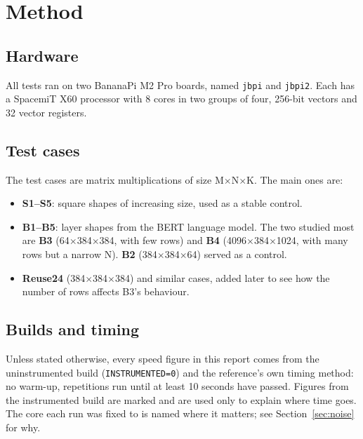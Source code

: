 \documentclass[11pt,a4paper]{article}
\begin{document}
\section{Method}

\subsection{Hardware}
All tests ran on two BananaPi M2 Pro boards, named \texttt{jbpi} and \texttt{jbpi2}. Each has a SpacemiT X60
processor with 8 cores in two groups of four, 256-bit vectors and 32 vector registers.

\subsection{Test cases}
The test cases are matrix multiplications of size M$\times$N$\times$K. The main ones are:
\begin{itemize}
  \item \textbf{S1--S5}: square shapes of increasing size, used as a stable control.
  \item \textbf{B1--B5}: layer shapes from the BERT language model. The two studied most are
  \textbf{B3} (64$\times$384$\times$384, with few rows) and \textbf{B4} (4096$\times$384$\times$1024, with many
  rows but a narrow N). \textbf{B2} (384$\times$384$\times$64) served as a control.
  \item \textbf{Reuse24} (384$\times$384$\times$384) and similar cases, added later to see how the number of rows
  affects B3's behaviour.
\end{itemize}

\subsection{Builds and timing}
Unless stated otherwise, every speed figure in this report comes from the uninstrumented build
(\texttt{INSTRUMENTED=0}) and the reference's own timing method: no warm-up, repetitions run until at least
10 seconds have passed. Figures from the instrumented build are marked and are used only to explain where time
goes. The core each run was fixed to is named where it matters; see Section~\ref{sec:noise} for why.
\end{document}
